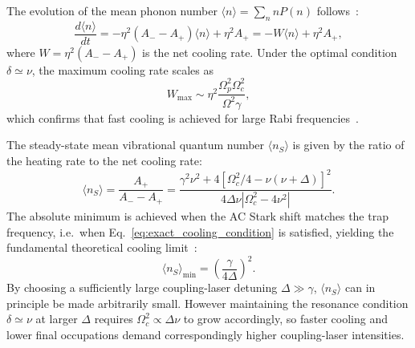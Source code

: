 The evolution of the mean phonon number $\langle n \rangle = \sum_n n P(n)$ follows~\cite{Morigi:00, Morigi:03}:
\begin{equation}
    \frac{d\langle n\rangle}{dt} = -\eta^2 (A_- - A_+) \langle n\rangle + \eta^2 A_+ = -W\langle n\rangle + \eta^2 A_+,
    \label{eq:mean_phonon_evolution}
\end{equation}
where $W = \eta^2 (A_- - A_+)$ is the net cooling rate. Under the optimal condition $\delta \simeq \nu$, the maximum cooling rate scales as
\begin{equation}
    W_{\text{max}} \sim \eta^2 \frac{\Omega_p^2 \Omega_c^2}{\Omega^2 \gamma},
    \label{eq:W_max}
\end{equation}
which confirms that fast cooling is achieved for large Rabi frequencies~\cite{Morigi:03}.

The steady-state mean vibrational quantum number $\langle n_S \rangle$ is given by the ratio of the heating rate to the net cooling rate:
\begin{equation}
    \langle n_S \rangle = \frac{A_+}{A_- - A_+} = \frac{\gamma^2\nu^2 + 4[\Omega_c^2/4 - \nu(\nu + \Delta)]^2}{4\Delta\nu|\Omega_c^2 - 4\nu^2|}.
    \label{eq:steady_state_n}
\end{equation}
The absolute minimum is achieved when the AC Stark shift matches the trap frequency, i.e.\ when Eq.~\eqref{eq:exact_cooling_condition} is satisfied, yielding the fundamental theoretical cooling limit~\cite{Morigi:00, Morigi:03}:
\begin{equation}
    \langle n_S \rangle_{\text{min}} = \left(\frac{\gamma}{4\Delta}\right)^2.
    \label{eq:n_min}
\end{equation}
By choosing a sufficiently large coupling-laser detuning $\Delta \gg \gamma$, $\langle n_S \rangle$ can in principle be made arbitrarily small. However maintaining the resonance condition $\delta \simeq \nu$ at larger $\Delta$ requires $\Omega_c^2 \propto \Delta\nu$ to grow accordingly, so faster cooling and lower final occupations demand correspondingly higher coupling-laser intensities.
